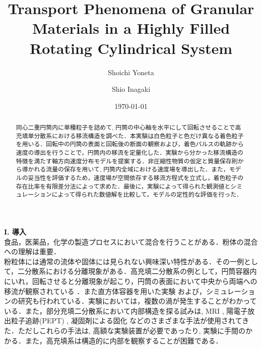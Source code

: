 \documentclass[prl,twocolumn,superscriptaddress]{revtex4}
\begin{document}
\title{Transport Phenomena of Granular Materials in a Highly Filled Rotating Cylindrical System}

\author{Shoichi Yoneta}

\author{Shio Inagaki}

\date{\today}

\begin{abstract}
同心二重円筒内に単種粒子を詰めて, 円筒の中心軸を水平にして回転させることで高充填単分散系における移流構造を調べた．本実験は白色粒子と色だけ異なる着色粒子を用いる．回転中の円筒の表面と回転後の断面の観察および，着色パルスの軌跡から速度の導出を行うことで，円筒内の移流を定量化した．実験から分かった移流構造の特徴を満たす軸方向速度分布モデルを提案する．非圧縮性物質の仮定と質量保存則から導かれる流量の保存を用いて, 円筒内全域における速度場を導出した．また，モデルの妥当性を評価するため，速度場が空間依存する移流方程式を立式し，着色粒子の存在比率を有限差分法によって求めた．最後に，実験によって得られた観測値とシミュレーションによって得られた数値解を比較して，モデルの定性的な評価を行った．
\end{abstract}
\maketitle

{\bf I. 導入} \\
食品，医薬品，化学の製造プロセスにおいて混合を行うことがある．粉体の混合への理解は重要．\\

粉粒体には通常の流体や固体には見られない興味深い特性がある．その一例として，二分散系における分離現象がある．高充填二分散系の例として，円筒容器内にいれ，回転させると分離現象が起こり，円筒の表面において中央から両端への移流が観察されている \cite{Inagaki10, Inagaki15}．また直方体容器を用いた実験 \cite{Rietz08:rectangularExpt, Rietz12:rectangularExpt} および，シミュレーション\cite{Awazu00:rectangularSimu}の研究も行われている．実験においては，複数の渦が発生することがわかっている．また，部分充填二分散系において内部構造を探る試みは, MRI \cite{Hill97:MRI},  陽電子放出粒子追跡(PEPT) \cite{Ding01:PEPT}, 凝固剤による固化 \cite{Santomaso04:solid}などのさまざまな手法が使用されてきた．ただしこれらの手法は, 高額な実験装置が必要であったり, 実験に手間のかかる．また，高充填系は構造的に内部を観察することが困難である．
\end{document}
